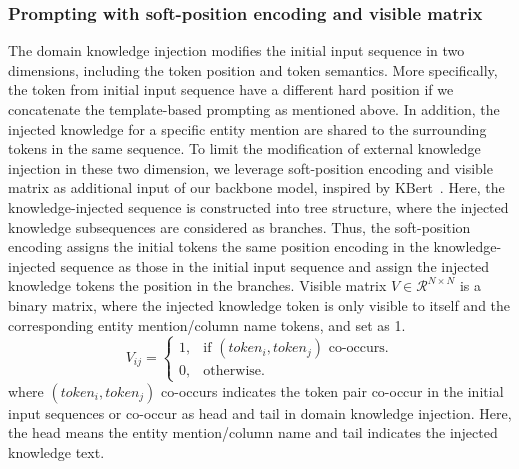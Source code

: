 \subsubsection{Prompting with soft-position encoding and visible matrix}
The domain knowledge injection modifies the initial input sequence in two dimensions, including the token position and token semantics. More specifically, the token from initial input sequence have a different hard position if we concatenate the template-based prompting as mentioned above. In addition, the injected knowledge for a specific entity mention are shared to the surrounding tokens in the same sequence. To limit the modification of external knowledge injection in these two dimension, we leverage soft-position encoding and visible matrix as additional input of our backbone model, inspired by KBert~\cite{liu_k-bert_2020}. Here, the knowledge-injected sequence is constructed into tree structure, where the injected knowledge subsequences are considered as branches. Thus, the soft-position encoding assigns the initial tokens the same position encoding in the knowledge-injected sequence as those in the initial input sequence and assign the injected knowledge tokens the position in the branches. Visible matrix $V\in \mathcal{R}^{N \times N}$ is a binary matrix, where the injected knowledge token is only visible to itself and the corresponding entity mention/column name tokens, and set as 1.
\begin{equation}
    V_{ij} = \begin{cases}
    1, & \text{if $(token_i, token_j)$ co-occurs}.\\
    0, & \text{otherwise}.
  \end{cases}
\end{equation}
where $(token_i, token_j)$ co-occurs indicates the token pair co-occur in the initial input sequences or  co-occur as head and tail in domain knowledge injection. Here, the head means the entity mention/column name and tail indicates the injected knowledge text. 

